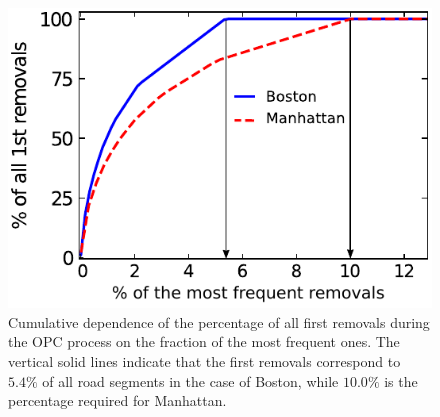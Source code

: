 \documentclass[aps,prl,twocolumn,showpacs, superscriptaddress,floatfix, 10pt]{revtex4-1}
\begin{document}
\begin{figure}[H]
\centering
\includegraphics[width=0.85\columnwidth]{figS4} 
\caption{Cumulative dependence of the percentage of all first removals
during the OPC process on the fraction of the most frequent ones. The
vertical solid lines indicate that the first removals correspond to $5.4\%$
of all road segments in the case of Boston, while $10.0\%$ is the
percentage required for Manhattan.}
\end{figure}
\end{document}
